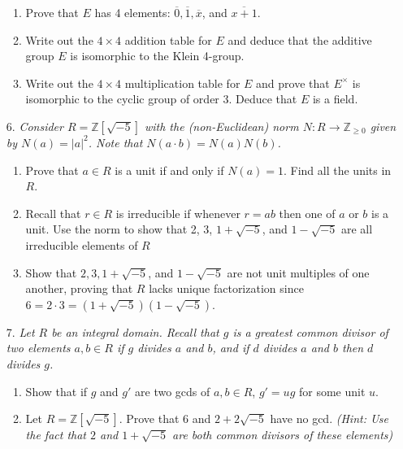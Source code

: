 \documentclass[12pt]{article}
\newcommand{\Z}{\mathbb{Z}}
\newcommand{\ba}{\overline}
\begin{document}
\begin{enumerate}
\begin{enumerate}
    \item Prove that $E$ has 4 elements: $\ba{0}, \ba{1}, \ba{x}$, and $\ba{x+1}$.
    
    \item Write out the $4\times 4$ addition table for $E$ and deduce that the additive group $E$ is isomorphic to the Klein 4-group.

    \item Write out the $4\times 4$ multiplication table for $E$ and prove that $E^\times$ is isomorphic to the cyclic group of order 3. Deduce that $E$ is a field.
\end{enumerate}

\item[6.] \textit{Consider $R = \Z[\sqrt{-5}]$ with the (non-Euclidean) norm $N:R\to \Z_{\ge 0}$ given by $N(a) = |a|^2$. Note that $N(a\cdot b) = N(a)N(b)$.}

\begin{enumerate}
    \item Prove that $a\in R$ is a unit if and only if $N(a) = 1$. Find all the units in $R$.
    
    \item Recall that $r\in R$ is irreducible if whenever $r = ab$ then one of $a$ or $b$ is a unit. Use the norm to show that 2, 3, $1+\sqrt{-5}$, and $1-\sqrt{-5}$ are all irreducible elements of $R$
    
    \item Show that $2, 3, 1 + \sqrt{-5}$, and $1 - \sqrt{-5}$ are not unit multiples of one another, proving that $R$ lacks unique factorization since $6 = 2\cdot 3 = (1+\sqrt{-5})(1-\sqrt{-5})$.
\end{enumerate}

 
\item[7.] \textit{Let $R$ be an integral domain. Recall that $g$ is a greatest common divisor of two elements $a, b\in R$
if $g$ divides $a$ and $b$, and if $d$ divides $a$ and $b$ then $d$ divides $g$.}

\begin{enumerate}
    \item Show that if $g$ and $g'$ are two gcds of $a,b\in R$, $g' = ug$ for some unit $u$.
    
    \item Let $R = \Z[\sqrt{-5}]$. Prove that $6$ and $2+2\sqrt{-5}$ have no gcd. \emph{(Hint: Use the fact that $2$ and $1+\sqrt{-5}$ are both common divisors of these elements)}
\end{enumerate}

\end{enumerate}
\end{document}
